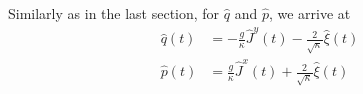 \documentclass{article}
\begin{document}

Similarly as in the last section, for $\hat{q}$ and $\hat{p}$, we arrive at
\begin{align}
    \label{qEqnFinal}
    \hat{q}(t) &= -\frac{g}{\kappa}\hat{J}^y(t)-\frac{2}{\sqrt{\kappa}}\hat{\xi}(t)\\
     \label{pEqnFinal}
    \hat{p}(t) &= \frac{g}{\kappa}\hat{J}^x(t)+\frac{2}{\sqrt{\kappa}}\hat{\xi}(t)
\end{align}
\end{document}
